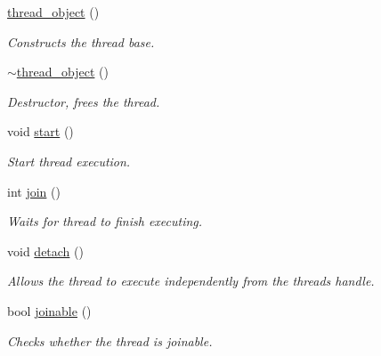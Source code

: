 \begin{DoxyCompactItemize}
\item 
\mbox{\label{classcpen333_1_1thread_1_1thread__object_a1e15fda903a0e1bbc0c06fc7d870d0d9}} 
\hyperlink{classcpen333_1_1thread_1_1thread__object_a1e15fda903a0e1bbc0c06fc7d870d0d9}{thread\+\_\+object} ()
\begin{DoxyCompactList}\small\item\em Constructs the thread base. \end{DoxyCompactList}\item 
\mbox{\label{classcpen333_1_1thread_1_1thread__object_addcca372aa82c04d454ade7fd60d1e75}} 
\hyperlink{classcpen333_1_1thread_1_1thread__object_addcca372aa82c04d454ade7fd60d1e75}{$\sim$thread\+\_\+object} ()
\begin{DoxyCompactList}\small\item\em Destructor, frees the thread. \end{DoxyCompactList}\item 
void \hyperlink{classcpen333_1_1thread_1_1thread__object_ae4484909a3f4418c0c0db318d615bde1}{start} ()
\begin{DoxyCompactList}\small\item\em Start thread execution. \end{DoxyCompactList}\item 
int \hyperlink{classcpen333_1_1thread_1_1thread__object_ac7334918eabfcf855cec00ed2a68a039}{join} ()
\begin{DoxyCompactList}\small\item\em Waits for thread to finish executing. \end{DoxyCompactList}\item 
\mbox{\label{classcpen333_1_1thread_1_1thread__object_a6e6fd163c5f5f72dcd6385a74ad316b6}} 
void \hyperlink{classcpen333_1_1thread_1_1thread__object_a6e6fd163c5f5f72dcd6385a74ad316b6}{detach} ()
\begin{DoxyCompactList}\small\item\em Allows the thread to execute independently from the thread\textquotesingle{}s handle. \end{DoxyCompactList}\item 
bool \hyperlink{classcpen333_1_1thread_1_1thread__object_a374e31ea56accc37a3468012a411da5d}{joinable} ()
\begin{DoxyCompactList}\small\item\em Checks whether the thread is joinable. \end{DoxyCompactList}\end{DoxyCompactItemize}
